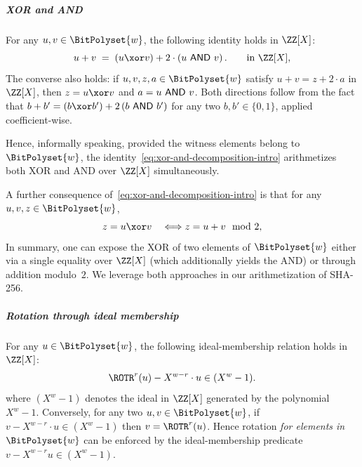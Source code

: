 







\subparagraph{XOR and AND}  For any $u, v \in \BitPolyset{w}$, the following identity holds in $\ZZ[X]$:
\begin{equation}
\label{eq:xor-and-decomposition-intro}
  u+v 
  \;=\; \left(u\xor v\right) + 2\cdot \left(u\band v\right).
  \qquad\text{in }\ZZ[X],
\end{equation}
The converse also holds: if $u,v,z,a\in\BitPolyset{w}$ satisfy $u+v=z + 2\cdot a$ in $\ZZ[X]$, then $z=u\xor v$ and $a=u\ \mathsf{AND}\  v$. Both directions follow from the fact that $b + b' = (b \xor b') + 2\,(b\band b')$  for any two $b,b'\in\{0,1\}$, applied coefficient-wise.

Hence, informally speaking, provided the witness elements belong to $\BitPolyset{w}$, the identity~\eqref{eq:xor-and-decomposition-intro} arithmetizes both XOR and AND over $\ZZ[X]$ simultaneously.

A further consequence of~\eqref{eq:xor-and-decomposition-intro} is that for any $u,v, z\in\BitPolyset{w}$,
\begin{equation}
\label{eq:xor-mod2-intro}
z = u \xor v \quad \Longleftrightarrow z = u + v  \mod 2,
\end{equation}
%
In summary, one can expose the XOR of two elements of $\BitPolyset{w}$ either via a single equality over $\ZZ[X]$ (which additionally yields the AND) or through addition modulo~$2$. We leverage both approaches in our arithmetization of SHA-256. 



\subparagraph{Rotation through ideal membership} For any $u\in\BitPolyset{w}$, the following ideal-membership relation holds in $\ZZ[X]$:
\begin{equation}
\label{eq:rotation-poly}
  \ROTR^r(u) - X^{w-r}\cdot  u \in (X^w-1).
\end{equation}
where $(X^w-1)$ denotes the ideal in $\ZZ[X]$ generated by the polynomial $X^w-1$. 
Conversely, for any two $u, v\in\BitPolyset{w}$, if $v - X^{w-r}\cdot u \in (X^w-1)$ then $v = \ROTR^r(u)$.
Hence rotation \emph{for elements in $\BitPolyset{w}$} can be enforced by the ideal-membership predicate $v - X^{w-r} u \in (X^w-1)$. 

